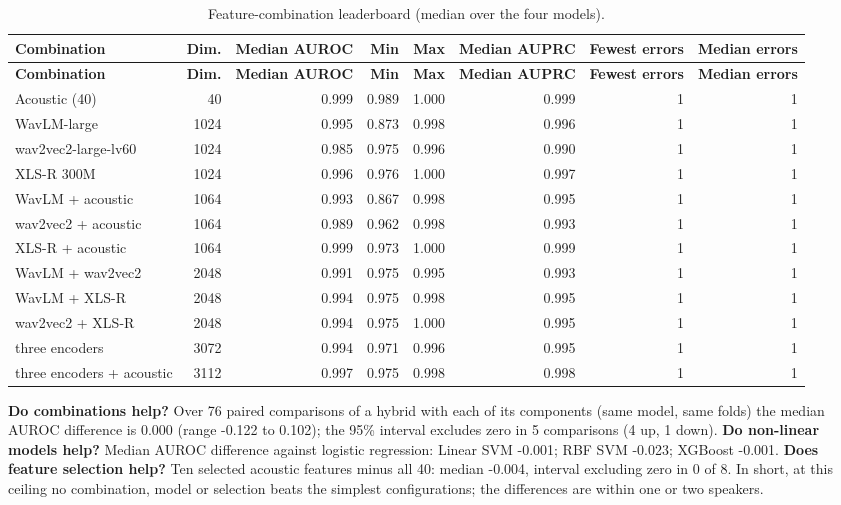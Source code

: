 \documentclass[10pt,a4paper]{article}
\begin{document}
\begin{center}\scriptsize\renewcommand{\arraystretch}{1.12}
\begin{longtable}{lrrrrrrr}
\caption{Feature-combination leaderboard (median over the four models).}\\
\toprule
\textbf{Combination} & \textbf{Dim.} & \textbf{Median AUROC} & \textbf{Min} & \textbf{Max} & \textbf{Median AUPRC} & \textbf{Fewest errors} & \textbf{Median errors}\\\midrule\endfirsthead
\toprule
\textbf{Combination} & \textbf{Dim.} & \textbf{Median AUROC} & \textbf{Min} & \textbf{Max} & \textbf{Median AUPRC} & \textbf{Fewest errors} & \textbf{Median errors}\\\midrule\endhead
\bottomrule\endfoot
Acoustic (40) & 40 & 0.999 & 0.989 & 1.000 & 0.999 & 1 & 1\\
WavLM-large & 1024 & 0.995 & 0.873 & 0.998 & 0.996 & 1 & 1\\
wav2vec2-large-lv60 & 1024 & 0.985 & 0.975 & 0.996 & 0.990 & 1 & 1\\
XLS-R 300M & 1024 & 0.996 & 0.976 & 1.000 & 0.997 & 1 & 1\\
WavLM + acoustic & 1064 & 0.993 & 0.867 & 0.998 & 0.995 & 1 & 1\\
wav2vec2 + acoustic & 1064 & 0.989 & 0.962 & 0.998 & 0.993 & 1 & 1\\
XLS-R + acoustic & 1064 & 0.999 & 0.973 & 1.000 & 0.999 & 1 & 1\\
WavLM + wav2vec2 & 2048 & 0.991 & 0.975 & 0.995 & 0.993 & 1 & 1\\
WavLM + XLS-R & 2048 & 0.994 & 0.975 & 0.998 & 0.995 & 1 & 1\\
wav2vec2 + XLS-R & 2048 & 0.994 & 0.975 & 1.000 & 0.995 & 1 & 1\\
three encoders & 3072 & 0.994 & 0.971 & 0.996 & 0.995 & 1 & 1\\
three encoders + acoustic & 3112 & 0.997 & 0.975 & 0.998 & 0.998 & 1 & 1\\
\end{longtable}\end{center}
\textbf{Do combinations help?} Over 76 paired comparisons of a hybrid with each of its components (same model, same folds) the median AUROC difference is 0.000 (range -0.122 to 0.102); the 95\% interval excludes zero in 5 comparisons (4 up, 1 down). \textbf{Do non-linear models help?} Median AUROC difference against logistic regression: Linear SVM -0.001; RBF SVM -0.023; XGBoost -0.001. \textbf{Does feature selection help?} Ten selected acoustic features minus all 40: median -0.004, interval excluding zero in 0 of 8. In short, at this ceiling no combination, model or selection beats the simplest configurations; the differences are within one or two speakers.
\end{document}
